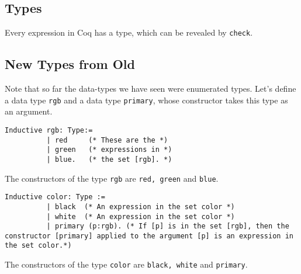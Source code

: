 	\subsection{Types}
	\label{subsec:types}
	     Every expression in Coq has a type, which can be revealed by \lstinline!check!. 

	\subsection{New Types from Old}
	\label{subsec:newTypesFromOld}
	          
		 Note that so far the data-types we have seen were enumerated types.
		 Let's define a data type \lstinline!rgb! and a data type \lstinline!primary!, whose constructor takes this type as an argument.
		 
	    \begin{minipage}[t]{0.45\textwidth}
		\begin{lstlisting}[caption = \lstinline!rgb!, label = lst:rgb]
		 Inductive rgb: Type:=
		  | red     (* These are the *)
		  | green   (* expressions in *)
		  | blue.   (* the set [rgb]. *)
		 \end{lstlisting}
		 The constructors of the type \lstinline!rgb! are \lstinline!red, green! and \lstinline!blue!. 
		 \end{minipage}
		 \hfill	 
		 \begin{minipage}[t]{0.45\textwidth}
		 \begin{lstlisting}[caption = \lstinline!color!, label = lst:color ]
		 Inductive color: Type := 
		  | black  (* An expression in the set color *)
		  | white  (* An expression in the set color *)
		  | primary (p:rgb). (* If [p] is in the set [rgb], then the constructor [primary] applied to the argument [p] is an expression in the set color.*) 
		 \end{lstlisting}
		 The constructors of the type \lstinline!color! are \lstinline!black, white! and \lstinline!primary!.\\
		 \end{minipage}	 	 
		 
